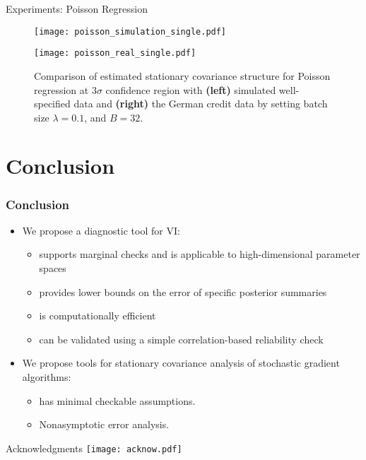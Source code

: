 \documentclass[10pt,xcolor=table]{beamer}
\begin{document}
\begin{frame}{Experiments: Poisson Regression}
\begin{figure}[t]
	\centering
	\begin{minipage}[b]{0.4\textwidth}
		\centering
		\texttt{[image: poisson\_simulation\_single.pdf]} 
	\end{minipage}
	\hspace{0.0001\textwidth}  %
	\begin{minipage}[b]{0.4\textwidth}
		\centering
		\texttt{[image: poisson\_real\_single.pdf]} 
	\end{minipage}
	
	\caption{Comparison of estimated stationary covariance structure for Poisson regression at $3\sigma$ confidence region with \textbf{(left)} simulated well-specified data and \textbf{(right)} the German credit data by setting batch size $\lambda = 0.1$, and $B = 32$.
	} %
\label{Fig: Poisson regression fixed_lr}
\end{figure}
\end{frame}




\section{Conclusion}
\begin{frame}
  \frametitle{Conclusion}
  \begin{itemize}
  \item We propose a diagnostic tool for VI:
\begin{itemize}
	\item supports marginal checks and is applicable to high-dimensional parameter spaces
	\item provides lower bounds on the error of specific posterior summaries
	\item is computationally efficient
	\item can be validated using a simple correlation-based reliability check
\end{itemize}
\item We propose tools for stationary covariance analysis of stochastic gradient algorithms:
\begin{itemize}
	\item has minimal checkable assumptions. 
	\item Nonasymptotic error analysis. 
\end{itemize}
  \end{itemize}
\end{frame}


\begin{frame}{\Large Acknowledgments}
	\texttt{[image: acknow.pdf]} 
\end{frame}
\end{document}

